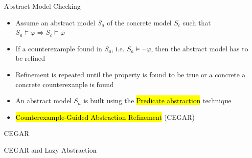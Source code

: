 
\begin{frame}{Abstract Model Checking}
\begin{itemize}
  \itemsep1em
   
  \item Assume an abstract model $S_a$ of the concrete model $S_c$ such that
    $S_a \models \varphi \Rightarrow S_c \models \varphi$
  
  \item If a counterexample found in $S_a$, i.e. $S_a \models \neg \varphi$,
  then the abstract model has to be refined
  
  \item Refinement is repeated until the property is found to be true or a
  concrete a concrete counterexanple is found
  
  \item An abstract model $S_a$ is built using the \hl{Predicate abstraction}
  technique
  
  \item \hl{Counterexample-Guided Abstraction Refinement} (CEGAR)  
\end{itemize}
\end{frame}


\begin{frame}{CEGAR}
\resizebox{1.05\textwidth}{!}{
    
}
\end{frame}


\begin{frame}{CEGAR and Lazy Abstraction}
\resizebox{1.05\textwidth}{!}{
    
}
\end{frame}


